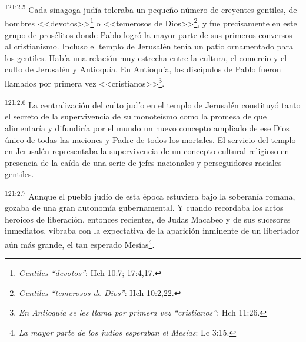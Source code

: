 \par 
\textsuperscript{121:2.5} Cada sinagoga judía toleraba un pequeño número de creyentes gentiles, de hombres <<devotos>>\footnote{\textit{Gentiles ``devotos''}: Hch 10:7; 17:4,17.} o <<temerosos de Dios>>\footnote{\textit{Gentiles ``temerosos de Dios''}: Hch 10:2,22.}, y fue precisamente en este grupo de prosélitos donde Pablo logró la mayor parte de sus primeros conversos al cristianismo. Incluso el templo de Jerusalén tenía un patio ornamentado para los gentiles. Había una relación muy estrecha entre la cultura, el comercio y el culto de Jerusalén y Antioquía. En Antioquía, los discípulos de Pablo fueron llamados por primera vez <<cristianos>>\footnote{\textit{En Antioquía se les llama por primera vez ``cristianos''}: Hch 11:26.}.

\par 
\textsuperscript{121:2.6} La centralización del culto judío en el templo de Jerusalén constituyó tanto el secreto de la supervivencia de su monoteísmo como la promesa de que alimentaría y difundiría por el mundo un nuevo concepto ampliado de ese Dios único de todas las naciones y Padre de todos los mortales. El servicio del templo en Jerusalén representaba la supervivencia de un concepto cultural religioso en presencia de la caída de una serie de jefes nacionales y perseguidores raciales gentiles.

\par 
\textsuperscript{121:2.7} Aunque el pueblo judío de esta época estuviera bajo la soberanía romana, gozaba de una gran autonomía gubernamental. Y cuando recordaba los actos heroicos de liberación, entonces recientes, de Judas Macabeo y de sus sucesores inmediatos, vibraba con la expectativa de la aparición inminente de un libertador aún más grande, el tan esperado Mesías\footnote{\textit{La mayor parte de los judíos esperaban el Mesías}: Lc 3:15.}.

